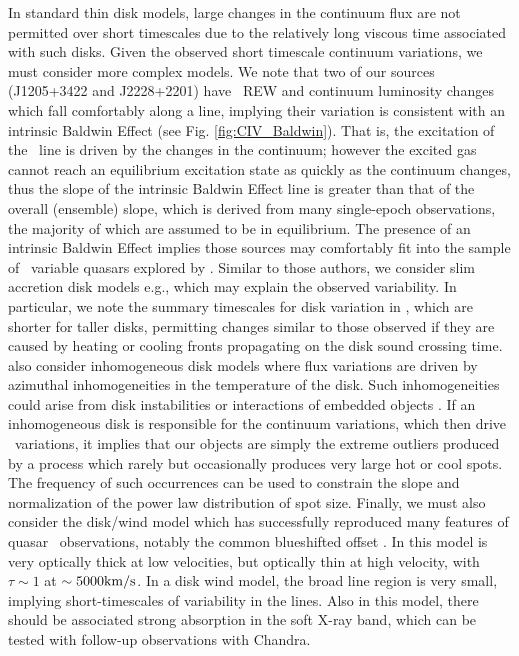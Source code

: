 \documentclass[fleqn,usenatbib]{mnras}
\begin{document}
In standard \citet{SS73} thin disk models, large changes in the continuum flux are not permitted over short timescales due to the relatively long viscous time associated with such disks. Given the observed short timescale continuum variations, we must consider more complex models. We note that two of our sources (J1205+3422 and J2228+2201) have \civ\ REW and continuum luminosity changes which fall comfortably along a line, implying their variation is consistent with an intrinsic Baldwin Effect (see Fig. \ref{fig:CIV_Baldwin}). That is, the excitation of the \civ\ line is driven by the changes in the continuum; however the excited gas cannot reach an equilibrium excitation state as quickly as the continuum changes, thus the slope of the intrinsic Baldwin Effect line is greater than that of the overall (ensemble) slope, which is derived from many single-epoch observations, the majority of which are assumed to be in equilibrium.
The presence of an intrinsic Baldwin Effect implies those sources may comfortably fit into the sample of \civ\ variable quasars explored by \citet{Dyer2019}. Similar to those authors, we consider slim accretion disk models e.g., \citet[][]{Abramowicz1988} which may explain the observed variability. In particular, we note the summary timescales for disk variation in \citet{Stern2018}, which are shorter for taller disks, permitting changes similar to those observed if they are caused by heating or cooling fronts propagating on the disk sound crossing time. \citet{Dyer2019} also consider inhomogeneous disk models
\citep[e.g.][]{DexterAgol2011} where flux variations are driven by azimuthal inhomogeneities in the temperature of the disk. Such inhomogeneities could arise from disk instabilities \citep[e.g.][]{LightmanEardley1974} or interactions of embedded objects \citep[e.g.][]{McKernanetal2014,McKernanetal2018}. If an inhomogeneous disk is responsible for the continuum variations, which then drive \civ\ variations, it implies that our objects are simply the extreme outliers produced by a process which rarely but occasionally produces very large hot or cool spots. The frequency of such occurrences can be used to constrain the slope and normalization of the power law distribution of spot size.
Finally, we must also consider the disk/wind model which has successfully reproduced many features of quasar \civ\ observations, notably the common blueshifted offset \citep[see e.g.,][]{Murrayetal1995}. In this model \civ is very optically thick at low velocities, but optically thin at high velocity, with $\tau \sim 1$ at $\sim 5000{\rm km/s}$. In a disk wind model, the broad line region is very small, implying short-timescales of variability in the lines. Also in this model, there should be associated strong absorption in the soft X-ray band, which can be tested with follow-up observations with Chandra.
\end{document}
